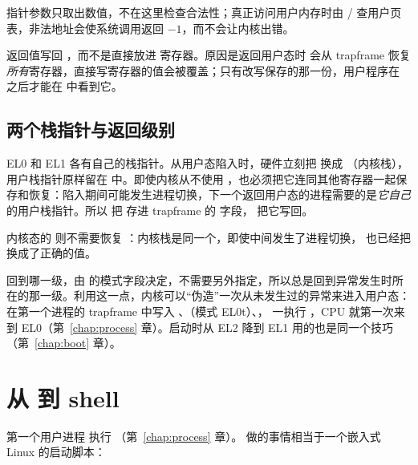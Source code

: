 指针参数只取出数值，不在这里检查合法性；真正访问用户内存时由 / 查用户页表，非法地址会使系统调用返回 $-1$，而不会让内核出错。

返回值写回 ，而不是直接放进  寄存器。原因是返回用户态时  会从 trapframe 恢复\emph{所有}寄存器，直接写寄存器的值会被覆盖；只有改写保存的那一份，用户程序在  之后才能在  中看到它。

\subsection{两个栈指针与返回级别}

EL0 和 EL1 各有自己的栈指针。从用户态陷入时，硬件立刻把  换成 （内核栈），用户栈指针原样留在  中。即使内核从不使用 ，也必须把它连同其他寄存器一起保存和恢复：陷入期间可能发生进程切换，下一个返回用户态的进程需要的是\emph{它自己}的用户栈指针。所以  把  存进 trapframe 的  字段， 把它写回。

内核态的  则不需要恢复 ：内核栈是同一个，即使中间发生了进程切换， 也已经把  换成了正确的值。

 回到哪一级，由  的模式字段决定，不需要另外指定，所以总是回到异常发生时所在的那一级。利用这一点，内核可以“伪造”一次从未发生过的异常来进入用户态： 在第一个进程的 trapframe 中写入 、（模式 EL0t）、， 一执行 ，CPU 就第一次来到 EL0（第~\ref{chap:process} 章）。启动时从 EL2 降到 EL1 用的也是同一个技巧（第~\ref{chap:boot} 章）。

\section{从  到 shell}

第一个用户进程  执行 （第~\ref{chap:process} 章）。 做的事情相当于一个嵌入式 Linux 的启动脚本：

